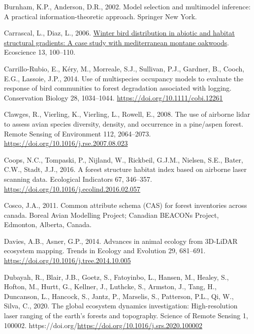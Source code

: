 \documentclass[
  12pt,
]{article}
\newlength{\cslhangindent}
\newlength{\cslentryspacingunit} %
\newenvironment{CSLReferences}[2] %
 {%
  \setlength{\parindent}{0pt}
  \ifodd #1
  \let\oldpar\par
  \def\par{\hangindent=\cslhangindent\oldpar}
  \fi
  \setlength{\parskip}{#2\cslentryspacingunit}
 }%
 {}
\begin{document}
\begin{CSLReferences}{1}{0}
\leavevmode{}%
Burnham, K.P., Anderson, D.R., 2002. Model selection and multimodel inference: A practical information-theoretic approach. Springer New York.

\leavevmode{}%
Carrascal, L., Diaz, L., 2006. \href{https://www.tandfonline.com/doi/abs/10.2980/1195-6860(2006)13\%5B100\%3AWBDIAA\%5D2.0.CO\%3B2}{Winter bird distribution in abiotic and habitat structural gradients: A case study with mediterranean montane oakwoods}. Ecoscience 13, 100--110.

\leavevmode{}%
Carrillo-Rubio, E., Kéry, M., Morreale, S.J., Sullivan, P.J., Gardner, B., Cooch, E.G., Lassoie, J.P., 2014. Use of multispecies occupancy models to evaluate the response of bird communities to forest degradation associated with logging. Conservation Biology 28, 1034--1044. \url{https://doi.org/10.1111/cobi.12261}

\leavevmode{}%
Clawges, R., Vierling, K., Vierling, L., Rowell, E., 2008. The use of airborne lidar to assess avian species diversity, density, and occurrence in a pine/aspen forest. Remote Sensing of Environment 112, 2064--2073. \url{https://doi.org/10.1016/j.rse.2007.08.023}

\leavevmode{}%
Coops, N.C., Tompaski, P., Nijland, W., Rickbeil, G.J.M., Nielsen, S.E., Bater, C.W., Stadt, J.J., 2016. A forest structure habitat index based on airborne laser scanning data. Ecological Indicators 67, 346--357. \url{https://doi.org/10.1016/j.ecolind.2016.02.057}

\leavevmode{}%
Cosco, J.A., 2011. Common attribute schema ({CAS}) for forest inventories across canada. Boreal Avian Modelling Project; Canadian {BEACONs} Project, Edmonton, Alberta, Canada.

\leavevmode{}%
Davies, A.B., Asner, G.P., 2014. Advances in animal ecology from 3D-{LiDAR} ecosystem mapping. Trends in Ecology and Evolution 29, 681--691. \url{https://doi.org/10.1016/j.tree.2014.10.005}

\leavevmode{}%
Dubayah, R., Blair, J.B., Goetz, S., Fatoyinbo, L., Hansen, M., Healey, S., Hofton, M., Hurtt, G., Kellner, J., Luthcke, S., Armston, J., Tang, H., Duncanson, L., Hancock, S., Jantz, P., Marselis, S., Patterson, P.L., Qi, W., Silva, C., 2020. The global ecosystem dynamics investigation: High-resolution laser ranging of the earth's forests and topography. Science of Remote Sensing 1, 100002. https://doi.org/\url{https://doi.org/10.1016/j.srs.2020.100002}


\end{CSLReferences}
\end{document}
